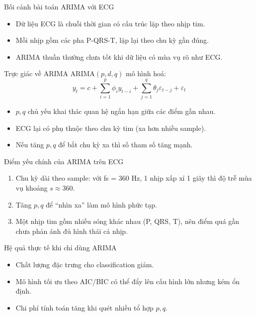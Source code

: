 \documentclass{beamer}
\begin{document}
\begin{frame}{Bối cảnh bài toán ARIMA với ECG}
    \begin{itemize}
        \item Dữ liệu ECG là chuỗi thời gian có cấu trúc lặp theo nhịp tim.
        \item Mỗi nhịp gồm các pha P-QRS-T, lặp lại theo chu kỳ gần đúng.
        \item ARIMA thuần thường chưa tốt khi dữ liệu có mùa vụ rõ như ECG.
    \end{itemize}
\end{frame}

\begin{frame}{Trực giác về ARIMA}
    ARIMA$(p,d,q)$ mô hình hoá:
    \[
        y_t = c + \sum_{i=1}^{p}\phi_i y_{t-i} + \sum_{j=1}^{q}\theta_j\varepsilon_{t-j} + \varepsilon_t
    \]
    \vspace{0.4cm}
    \begin{itemize}
        \item $p,q$ chủ yếu khai thác quan hệ ngắn hạn giữa các điểm gần nhau.
        \item ECG lại có phụ thuộc theo chu kỳ tim (xa hơn nhiều sample).
        \item Nếu tăng $p,q$ để bắt chu kỳ xa thì số tham số tăng mạnh.
    \end{itemize}
\end{frame}

\begin{frame}{Điểm yếu chính của ARIMA trên ECG}
    \begin{enumerate}
        \item Chu kỳ dài theo sample: với fs = 360 Hz, 1 nhịp xấp xỉ 1 giây thì độ trễ mùa vụ khoảng $s\approx 360$.
        \item Tăng $p,q$ để “nhìn xa” làm mô hình phức tạp.
        \item Một nhịp tim gồm nhiều sóng khác nhau (P, QRS, T), nên điểm quá gần chưa phản ánh đủ hình thái cả nhịp.
    \end{enumerate}
\end{frame}

\begin{frame}{Hệ quả thực tế khi chỉ dùng ARIMA}
    \begin{itemize}
        \item Chất lượng đặc trưng cho classification giảm.
        \item Mô hình tối ưu theo AIC/BIC có thể đẩy lên cấu hình lớn nhưng kém ổn định.
        \item Chi phí tính toán tăng khi quét nhiều tổ hợp $p,q$.
    \end{itemize}
\end{frame}
\end{document}

